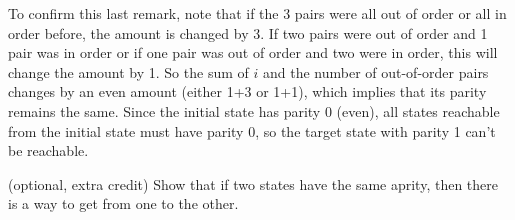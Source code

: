 \documentclass[handout]{mcs}
\begin{document}
\begin{problem}
\begin{problemparts}
{To confirm this last remark, note that if the 3 pairs were all out of
order or all in order before, the amount is changed by 3.  If two pairs
were out of order and 1 pair was in order or if one pair was out of order
and two were in order, this will change the amount by 1.  So the sum of
$i$ and the number of out-of-order pairs changes by an even amount (either
1+3 or 1+1), which implies that its parity remains the same.  Since the
initial state has parity 0 (even), all states reachable from the initial
state must have parity 0, so the target state with parity 1 can't be
reachable.}

\ppart (optional, extra credit) Show that if two states have the same
aprity, then there is a way to get from one to the other.

\end{problemparts}
\end{problem}




\end{document}
